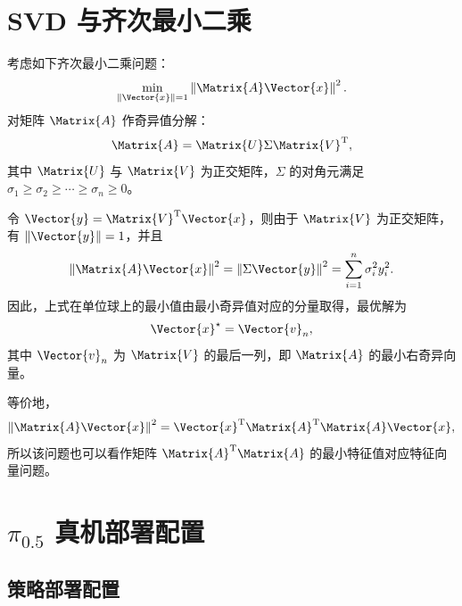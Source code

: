 \chapter{SVD 与齐次最小二乘}\label{app:svd}

考虑如下齐次最小二乘问题：
\begin{equation}
    \min_{\|\Vector{x}\|=1}\left\|\Matrix{A}\Vector{x}\right\|^2 .
\end{equation}
对矩阵 $\Matrix{A}$ 作奇异值分解：
\begin{equation}
    \Matrix{A}=\Matrix{U}\Sigma\Matrix{V}^{\mathrm T},
\end{equation}
其中 $\Matrix{U}$ 与 $\Matrix{V}$ 为正交矩阵，$\Sigma$ 的对角元满足
$\sigma_1\geq \sigma_2\geq \cdots \geq \sigma_n\geq 0$。

令 $\Vector{y}=\Matrix{V}^{\mathrm T}\Vector{x}$，则由于 $\Matrix{V}$ 为正交矩阵，有
$\|\Vector{y}\|=1$，并且
\begin{equation}
    \left\|\Matrix{A}\Vector{x}\right\|^2
    =
    \left\|\Sigma\Vector{y}\right\|^2
    =
    \sum_{i=1}^{n}\sigma_i^2 y_i^2 .
\end{equation}
因此，上式在单位球上的最小值由最小奇异值对应的分量取得，最优解为
\begin{equation}
    \Vector{x}^\star=\Vector{v}_n,
\end{equation}
其中 $\Vector{v}_n$ 为 $\Matrix{V}$ 的最后一列，即 $\Matrix{A}$ 的最小右奇异向量。

等价地，
\begin{equation}
    \left\|\Matrix{A}\Vector{x}\right\|^2
    =
    \Vector{x}^{\mathrm T}\Matrix{A}^{\mathrm T}\Matrix{A}\Vector{x},
\end{equation}
所以该问题也可以看作矩阵 $\Matrix{A}^{\mathrm T}\Matrix{A}$ 的最小特征值对应特征向量问题。

\chapter{$\pi_{0.5}$ 真机部署配置}\label{app:config}

\section{策略部署配置}

